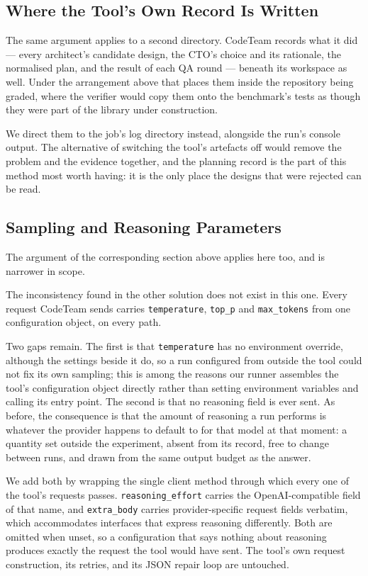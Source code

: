 \subsection{Where the Tool's Own Record Is Written}

The same argument applies to a second directory. CodeTeam records what it did
--- every architect's candidate design, the CTO's choice and its rationale, the
normalised plan, and the result of each QA round --- beneath its workspace as
well. Under the arrangement above that places them inside the repository being
graded, where the verifier would copy them onto the benchmark's tests as though
they were part of the library under construction.

We direct them to the job's log directory instead, alongside the run's console
output. The alternative of switching the tool's artefacts off would remove the
problem and the evidence together, and the planning record is the part of this
method most worth having: it is the only place the designs that were rejected
can be read.

\subsection{Sampling and Reasoning Parameters}

The argument of the corresponding section above applies here too, and is
narrower in scope.

The inconsistency found in the other solution does not exist in this one. Every
request CodeTeam sends carries \texttt{temperature}, \texttt{top\_p} and
\texttt{max\_tokens} from one configuration object, on every path.

Two gaps remain. The first is that \texttt{temperature} has no environment
override, although the settings beside it do, so a run configured from outside
the tool could not fix its own sampling; this is among the reasons our runner
assembles the tool's configuration object directly rather than setting
environment variables and calling its entry point. The second is that no
reasoning field is ever sent. As before, the consequence is that the amount of
reasoning a run performs is whatever the provider happens to default to for that
model at that moment: a quantity set outside the experiment, absent from its
record, free to change between runs, and drawn from the same output budget as
the answer.

We add both by wrapping the single client method through which every one of the
tool's requests passes. \texttt{reasoning\_effort} carries the OpenAI-compatible
field of that name, and \texttt{extra\_body} carries provider-specific request
fields verbatim, which accommodates interfaces that express reasoning
differently. Both are omitted when unset, so a configuration that says nothing
about reasoning produces exactly the request the tool would have sent. The
tool's own request construction, its retries, and its JSON repair loop are
untouched.

